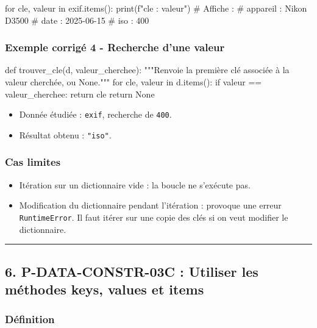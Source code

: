 \begin{python}
for cle, valeur in exif.items():
    print(f"{cle} : {valeur}")
# Affiche :
# appareil : Nikon D3500
# date : 2025-06-15
# iso : 400
\end{python}

\subsubsection{Exemple corrigé 4 - Recherche d’une valeur}

\begin{python}
def trouver_cle(d, valeur_cherchee):
    """Renvoie la première clé associée à la valeur cherchée, ou None."""
    for cle, valeur in d.items():
        if valeur == valeur_cherchee:
            return cle
    return None
\end{python}

\begin{itemize}
\tightlist
\item
  Donnée étudiée : \texttt{exif}, recherche de \texttt{400}.
\item
  Résultat obtenu : \texttt{"iso"}.
\end{itemize}

\subsubsection{Cas limites}

\begin{itemize}
\tightlist
\item
  Itération sur un dictionnaire vide : la boucle ne s'exécute pas.
\item
  Modification du dictionnaire pendant l'itération : provoque une erreur
  \texttt{RuntimeError}. Il faut itérer sur une copie des clés si on
  veut modifier le dictionnaire.
\end{itemize}

\begin{center}\rule{0.5\linewidth}{0.5pt}\end{center}

\subsection{6. P-DATA-CONSTR-03C : Utiliser les méthodes keys, values et items}

\subsubsection{Définition}


